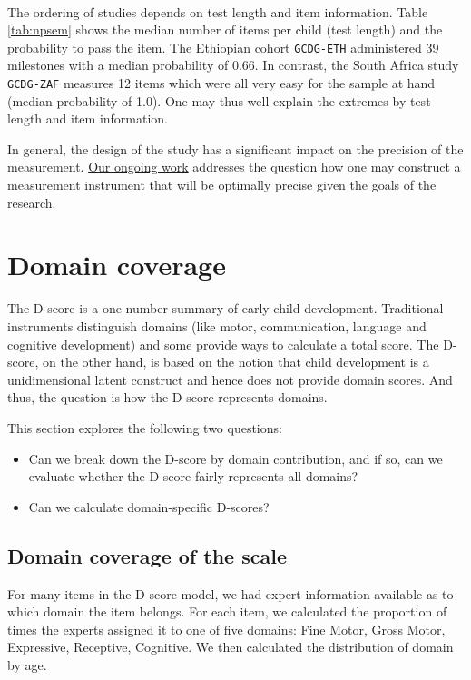 \documentclass[
]{book}
\providecommand{\tightlist}{%
  \setlength{\itemsep}{0pt}\setlength{\parskip}{0pt}}
\begin{document}
~

The ordering of studies depends on test length and item information. Table \ref{tab:npsem} shows the median number of items per child (test length) and the probability to pass the item. The Ethiopian cohort \texttt{GCDG-ETH} administered 39 milestones with a median probability of 0.66. In contrast, the South Africa study \texttt{GCDG-ZAF} measures 12 items which were all very easy for the sample at hand (median probability of 1.0). One may thus well explain the extremes by test length and item information.

In general, the design of the study has a significant impact on the precision of the measurement. \href{https://stefvanbuuren.name/dbook3/}{Our ongoing work} addresses the question how one may construct a measurement instrument that will be optimally precise given the goals of the research.

\hypertarget{sec:domains}{%
\section{Domain coverage}\label{sec:domains}}

The D-score is a one-number summary of early child development. Traditional instruments distinguish domains (like motor, communication, language and cognitive development) and some provide ways to calculate a total score. The D-score, on the other hand, is based on the notion that child development is a unidimensional latent construct and hence does not provide domain scores. And thus, the question is how the D-score represents domains.

This section explores the following two questions:

\begin{itemize}
\tightlist
\item
  Can we break down the D-score by domain contribution, and if so, can we evaluate whether the D-score fairly represents all domains?
\item
  Can we calculate domain-specific D-scores?
\end{itemize}

\hypertarget{domain-coverage-of-the-scale}{%
\subsection{Domain coverage of the scale}\label{domain-coverage-of-the-scale}}

For many items in the D-score model, we had expert information available as to which domain the item belongs. For each item, we calculated the proportion of times the experts assigned it to one of five domains: Fine Motor, Gross Motor, Expressive, Receptive, Cognitive. We then calculated the distribution of domain by age.
\end{document}
